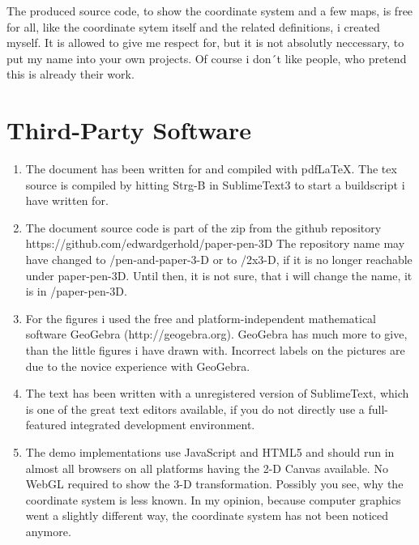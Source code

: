 \documentclass[a4paper]{article}
\begin{document}
\begin{PropositionOpt4}
The produced source code, to show the coordinate system and a few maps, is free for all, like the coordinate
sytem itself and the related definitions, i created myself. It is allowed to give me respect for, but it is 
not absolutly neccessary, to put my name into your own projects. Of course i don´t like people, who pretend 
this is already their work.\\

\section{Third-Party Software}

\begin{enumerate}
\item The document has been written for and compiled with pdf\LaTeX.  The tex source is compiled by hitting Strg-B
in SublimeText3 to start a buildscript i have written for.

\item The document source code is part of the zip from the github repository https://github.com/edwardgerhold/paper-pen-3D
The repository name may have changed to /pen-and-paper-3-D or to /2x3-D, if it is no longer reachable under paper-pen-3D.
Until then, it is not sure, that i will change the name, it is in /paper-pen-3D. 

\item For the figures i used the free and platform-independent mathematical software GeoGebra (http://geogebra.org). GeoGebra has much more to give, than the little figures i have drawn with. Incorrect labels on the pictures are due to the novice experience with GeoGebra.

\item The text has been written with a unregistered version of SublimeText, which is one of the great text editors 
available, if you do not directly use a full-featured integrated development environment.

\item The demo implementations use JavaScript and HTML5 and should run in almost all browsers on all platforms having the 
2-D Canvas  available. No WebGL required to show the 3-D transformation. Possibly you see, why the coordinate system
is less known. In my opinion, because computer graphics went a slightly different way, the coordinate system has not
been noticed anymore.
\end{enumerate}


\end{PropositionOpt4}
\end{document}
